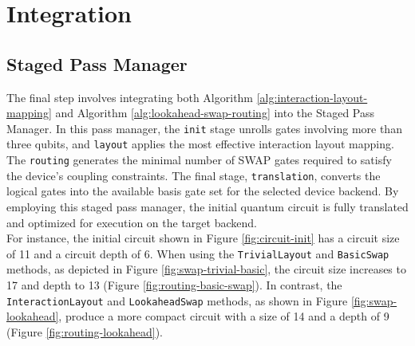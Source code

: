 \section{Integration}
\subsection{Staged Pass Manager} %
The final step involves integrating both Algorithm \ref{alg:interaction-layout-mapping}  and Algorithm \ref{alg:lookahead-swap-routing}  into the Staged Pass Manager. In this pass manager, the \lstinline{init} stage unrolls gates involving more than three qubits, and \lstinline{layout} applies the most effective interaction layout mapping. The \lstinline{routing} generates the minimal number of SWAP gates required to satisfy the device's coupling constraints. The final stage, \lstinline{translation}, converts the logical gates into the available basis gate set for the selected device backend. By employing this staged pass manager, the initial quantum circuit is fully translated and optimized for execution on the target backend. \\
For instance, the initial circuit shown in Figure \ref{fig:circuit-init} has a circuit size of 11 and a circuit depth of 6. When using the \lstinline{TrivialLayout} and \lstinline{BasicSwap} methods, as depicted in Figure \ref{fig:swap-trivial-basic}, the circuit size increases to 17 and depth to 13 (Figure \ref{fig:routing-basic-swap}). In contrast, the \lstinline{InteractionLayout} and \lstinline{LookaheadSwap} methods, as shown in Figure \ref{fig:swap-lookahead}, produce a more compact circuit with a size of 14 and a depth of 9 (Figure \ref{fig:routing-lookahead}).

